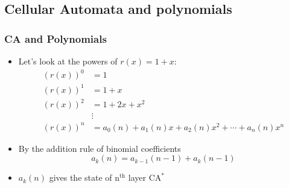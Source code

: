 \documentclass{beamer}
\begin{document}
\subsection{Cellular Automata and polynomials}
\begin{frame}
    \frametitle{CA and Polynomials}
    \begin{itemize}
        \item Let's look at the powers of $r(x) = 1 + x$:
        \begin{align*}
            (r(x))^{0} &=1 \\
            (r(x))^{1} &=1+x \\
            (r(x))^{2} &=1+2 x+x^{2} \\
            & \vdots \\
            (r(x))^{n} &=a_{0}(n)+a_{1}(n) x+a_{2}(n) x^{2}+\cdots+a_{n}(n) x^{n} 
        \end{align*}
        \item By the addition rule of binomial coefficients
        \begin{equation*}
            a_k(n) = a_{k-1}(n-1) + a_k(n-1)
        \end{equation*}
        \item $a_k(n)$ gives the state of $\text{n}^{\text{th}}$ layer $\text{CA}^*$ 
    \end{itemize}
\end{frame}
\end{document}
